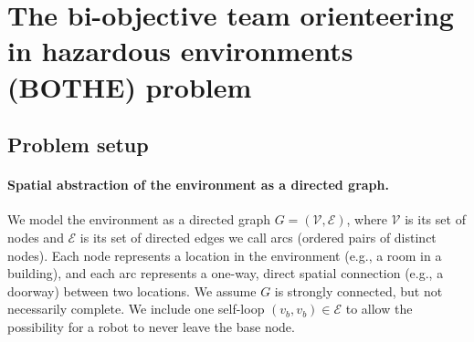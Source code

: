 \documentclass[11pt, oneside]{article}
\begin{document}
\section{The bi-objective team orienteering in hazardous environments (BOTHE) problem}




\subsection{Problem setup}

\paragraph{Spatial abstraction of the environment as a directed graph.}
We model the environment as a directed graph $G=(\mathcal{V}, \mathcal{E})$, where $\mathcal{V}$ is its set of nodes and $\mathcal{E}$ is its set of directed edges we call arcs (ordered pairs of distinct nodes).
Each node represents a location in the environment (e.g., a room in a building), and each arc represents a one-way, direct spatial connection (e.g., a doorway) between two locations.
We assume $G$ is strongly connected, but not necessarily complete. We include one self-loop $(v_b, v_b) \in \mathcal{E}$ to allow the possibility for a robot to never leave the base node.

\end{document}
